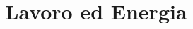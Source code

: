 \documentclass[../../fisica]{subfiles}
\begin{document}
    \chapter{Lavoro ed Energia}


%        
%           
%
%
%

        \renewcommand{\arraystretch}{1.5}
\end{document}
